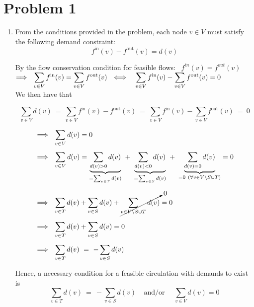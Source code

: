\documentclass[twoside,11pt]{homework}
\date{\today}
\begin{document}
\maketitle

\section*{Problem 1}

\begin{enumerate}[\bf (i.)]

\item From the conditions provided in the problem, each node $v \in V$ must satisfy the following demand constraint:
$$ f^{\textrm{in}}(v) - f^{\textrm{out}}(v) = d(v)$$ 

By the flow conservation condition for feasible flows: \ $f^{in}(v) = f^{out}(v)$ \\[0.4em]
$\Longrightarrow \ \ \mathlarger{\sum_{v \in V} f^{\textrm{in}}(v) = \sum_{v \in V} f^{\textrm{out}}(v)} \ \  \Longleftrightarrow \ \ \ \mathlarger{\sum_{v \in V} f^{\textrm{in}}(v) - \sum_{v \in V} f^{\textrm{out}}(v) = 0}$ \\[0.4em]

We then have that

$$ \sum_{v \in V} d(v) \ = \ \sum_{v \in V} f^{\textrm{in}}(v) - f^{\textrm{out}}(v) \ = \ \sum_{v \in V} f^{\textrm{in}}(v) - \sum_{v \in V} f^{\textrm{out}}(v) \ = \ 0 $$

\begin{align*}
& \Longrightarrow \ \  \sum_{v \in V} d(v) = 0 \\[0.4em]
& \Longrightarrow \ \  \sum_{v \in V} d(v) = \underbrace{\sum_{d(v) > 0} d(v)}_{=\sum_{v\in T} d(v)} \ + \ \underbrace{\sum_{d(v) < 0} d(v)}_{=\sum_{v\in S} d(v)} \ + \ \underbrace{\sum_{d(v) = 0} d(v)}_{=0 \ (\forall v \in V \setminus S \cup T)} = 0 \\[0.7em]
& \Longrightarrow \ \ \sum_{v \in T} d(v) + \sum_{v \in S} d(v)  +  \cancelto{0}{\sum_{v \in V \setminus S \cup T} d(v)} = 0 \\[0.5em]
& \Longrightarrow \ \ \sum_{v \in T} d(v) + \sum_{v \in S} d(v) = 0 \\[0.5em]
& \Longrightarrow \ \ \sum_{v \in T} d(v) \ = \ - \sum_{v \in S} d(v)
\end{align*}

Hence, a necessary condition for a feasible circulation with demands to exist is 
$$\sum_{v \in T} d(v) \ = \ - \sum_{v \in S} d(v) \ \ \ \ \   \textrm{and/or} \ \ \ \ \ \   \sum_{v \in V} d(v) = 0$$ 


\end{enumerate}
\end{document}
